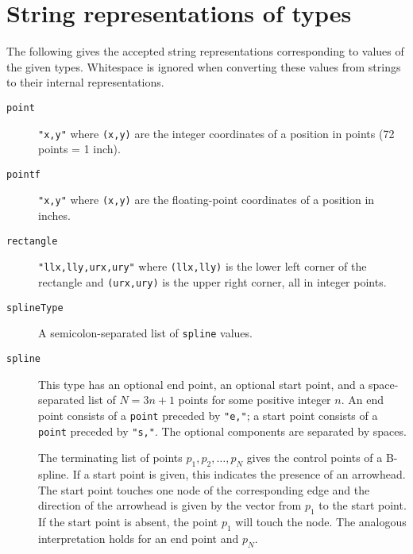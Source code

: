 \section{String representations of types}
\label{sec:types}
The following gives the accepted string representations 
corresponding to values of the given types. 
Whitespace is ignored when converting these values from strings
to their internal representations. 

\begin{description}
\item[{\tt point}] {\tt "x,y"} where {\tt (x,y)} are the integer coordinates 
of a position in points (72 points = 1 inch).
\item[{\tt pointf}] {\tt "x,y"} where {\tt (x,y)} are the 
floating-point coordinates of a position in inches.
\item[{\tt rectangle}] {\tt "llx,lly,urx,ury"} 
where {\tt (llx,lly)} is the lower left corner
of the rectangle and {\tt (urx,ury)} is the upper right corner, 
all in integer points.
\item[{\tt splineType}] A semicolon-separated list of {\tt spline} values.
\item[{\tt spline}] This type has an optional end point, an optional start
point, and a space-separated list of $N = 3n+1$ points for some positive 
integer $n$. An end point consists of a {\tt point} preceded by {\tt "e,"};
a start point consists of a {\tt point} preceded by {\tt "s,"}. The
optional components are separated by spaces.  

The terminating list of points $p_1,p_2,\ldots ,p_N$ gives the control points 
of a B-spline.
If a start point is given, this indicates the presence of an arrowhead.
The start point touches one node of the corresponding edge 
and the direction of the arrowhead is given by the vector from $p_1$
to the start point. If the start point is absent, the point $p_1$
will touch the node. The analogous interpretation holds for an end point
and $p_N$.
\end{description}
